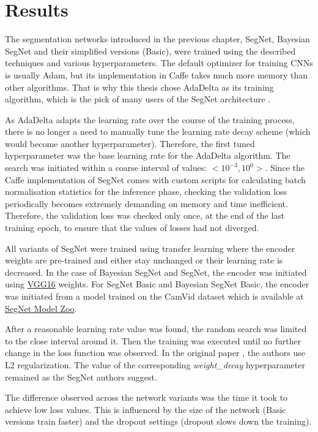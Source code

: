 \chapter{Results}

The segmentation networks introduced in the previous chapter, SegNet, Bayesian SegNet and their simplified versions (Basic), were trained using the described techniques and various hyperparameters. The default optimizer for training CNNs is usually Adam, but its implementation in Caffe takes much more memory than other algorithms. That is why this thesis chose AdaDelta as its training algorithm, which is the pick of many users of the SegNet architecture \cite{aizawan_github}.

As AdaDelta adapts the learning rate over the course of the training process, there is no longer a need to manually tune the learning rate decay scheme (which would become another hyperparameter). Therefore, the first tuned hyperparameter was the base learning rate for the AdaDelta algorithm. The search was initiated within a coarse interval of values: $ <10^{-3}, 10^{0}>  $. Since the Caffe implementation of SegNet comes with custom scripts for calculating batch normalisation statistics for the inference phase, checking the validation loss periodically becomes extremely demanding on memory and time inefficient. Therefore, the validation loss was checked only once, at the end of the last training epoch, to ensure that the values of losses had not diverged.  

All variants of SegNet were trained using transfer learning where the encoder weights are pre-trained and either stay unchanged or their learning rate is decreased. In the case of Bayesian SegNet and SegNet, the encoder was initiated using \href{http://www.robots.ox.ac.uk/~vgg/research/very_deep/}{VGG16} weights. For SegNet Basic and Bayesian SegNet Basic, the encoder was initiated from a model trained on the CamVid dataset which is available at \href{https://github.com/alexgkendall/SegNet-Tutorial/blob/master/Example_Models/segnet_model_zoo.md}{SegNet Model Zoo}. 

After a reasonable learning rate value was found, the random search was limited to the close interval around it. Then the training was executed until no further change in the loss function was observed. In the original paper \cite{segnet}, the authors use L2 regularization. The value of the corresponding \textit{weight\_decay} hyperparameter remained as the SegNet authors suggest. 

The difference observed across the network variants was the time it took to achieve low loss values. This is influenced by the size of the network (Basic versions train faster) and the dropout settings (dropout slows down the training).

